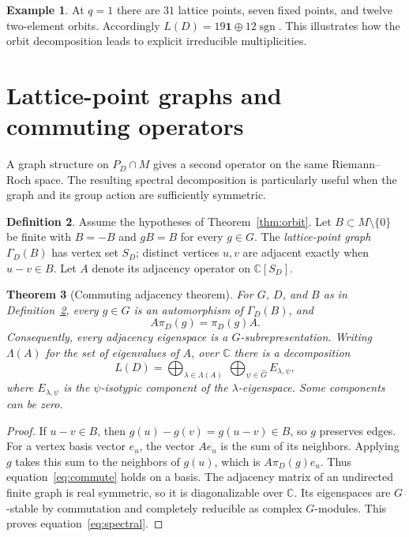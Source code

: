 \documentclass[12pt,letterpaper]{article}
\newtheorem{theorem}{Theorem}[section]
\theoremstyle{definition}
\newtheorem{definition}[theorem]{Definition}
\newtheorem{example}[theorem]{Example}
\theoremstyle{remark}
\numberwithin{equation}{section}
\newcommand{\CC}{\mathbb C}
\newcommand{\bfone}{\mathbf 1}
\begin{document}
\begin{example}
At $q=1$ there are $31$ lattice points, seven fixed points, and twelve two-element orbits. Accordingly $L(D)=19\bfone\oplus12\operatorname{sgn}$. This illustrates how the orbit decomposition leads to explicit irreducible multiplicities.
\end{example}

\section{Lattice-point graphs and commuting operators}\label{sec:graphs}
A graph structure on $P_D\cap M$ gives a second operator on the same Riemann--Roch space. The resulting spectral decomposition is particularly useful when the graph and its group action are sufficiently symmetric.

\begin{definition}\label{def:latticegraph}
Assume the hypotheses of Theorem~\ref{thm:orbit}. Let $B\subset M\setminus\{0\}$ be finite with $B=-B$ and $gB=B$ for every $g\in G$. The \emph{lattice-point graph} $\Gamma_D(B)$ has vertex set $S_D$; distinct vertices $u,v$ are adjacent exactly when $u-v\in B$. Let $A$ denote its adjacency operator on $\CC[S_D]$.
\end{definition}

\begin{theorem}[Commuting adjacency theorem]\label{thm:commute}
For $G$, $D$, and $B$ as in Definition~\ref{def:latticegraph}, every $g\in G$ is an automorphism of $\Gamma_D(B)$, and
\begin{equation}\label{eq:commute}
A\pi_D(g)=\pi_D(g)A.
\end{equation}
Consequently, every adjacency eigenspace is a $G$-subrepresentation. Writing $\Lambda(A)$ for the set of eigenvalues of $A$, over $\CC$ there is a decomposition
\begin{equation}\label{eq:spectral}
L(D)=\bigoplus_{\lambda\in\Lambda(A)}\ \bigoplus_{\psi\in\widehat G}E_{\lambda,\psi},
\end{equation}
where $E_{\lambda,\psi}$ is the $\psi$-isotypic component of the $\lambda$-eigenspace. Some components can be zero.
\end{theorem}
\begin{proof}
If $u-v\in B$, then $g(u)-g(v)=g(u-v)\in B$, so $g$ preserves edges. For a vertex basis vector $e_u$, the vector $Ae_u$ is the sum of its neighbors. Applying $g$ takes this sum to the neighbors of $g(u)$, which is $A\pi_D(g)e_u$. Thus equation~\eqref{eq:commute} holds on a basis. The adjacency matrix of an undirected finite graph is real symmetric, so it is diagonalizable over $\CC$. Its eigenspaces are $G$-stable by commutation and completely reducible as complex $G$-modules. This proves equation~\eqref{eq:spectral}.
\end{proof}
\end{document}
